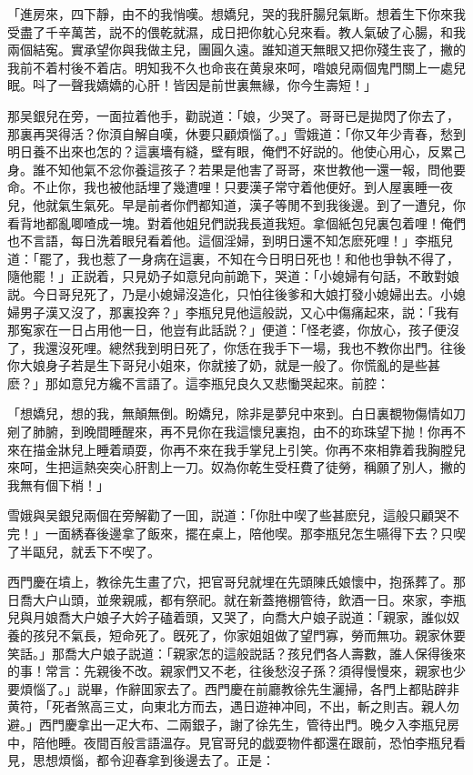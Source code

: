 「進房來，四下靜，由不的我悄嘆。想嬌兒，哭的我肝腸兒氣断。想着生下你來我受盡了千辛萬苦，説不的偎乾就濕，成日把你躭心兒來看。教人氣破了心腸，和我兩個結寃。實承望你與我做主兒，團圓久遠。誰知道天無眼又把你殘生丧了，撇的我前不着村後不着店。明知我不久也命丧在黄泉來呵，喒娘兒兩個鬼門關上一處兒眠。呌了一聲我嬌嬌的心肝！皆因是前世裏無緣，你今生壽短！」

那吴銀兒在旁，一面拉着他手，勸説道：「娘，少哭了。哥哥已是拋閃了你去了，那裏再哭得活？你湏自解自嘆，休要只顧煩惱了。」雪娥道：「你又年少青春，愁到明日養不出來也怎的？這裏墻有縫，壁有眼，俺們不好説的。他使心用心，反累己身。誰不知他氣不忿你養這孩子？若果是他害了哥哥，來世教他一還一報，問他要命。不止你，我也被他話埋了幾遭哩！只要漢子常守着他便好。到人屋裏睡一夜兒，他就氣生氣死。早是前者你們都知道，漢子等閒不到我後邊。到了一遭兒，你看背地都亂唧喳成一塊。對着他姐兒們説我長道我短。拿個紙包兒裏包着哩！俺們也不言語，每日洗着眼兒看着他。這個淫婦，到明日還不知怎麽死哩！」李瓶兒道：「罷了，我也惹了一身病在這裏，不知在今日明日死也！和他也爭執不得了，隨他罷！」正説着，只見奶子如意兒向前跪下，哭道：「小媳婦有句話，不敢對娘説。今日哥兒死了，乃是小媳婦沒造化，只怕往後爹和大娘打發小媳婦出去。小媳婦男子漢又沒了，那裏投奔？」李瓶兒見他這般説，又心中傷痛起來，説：「我有那寃家在一日占用他一日，他豈有此話説？」便道：「怪老婆，你放心，孩子便沒了，我還沒死哩。總然我到明日死了，你恁在我手下一場，我也不教你出門。往後你大娘身子若是生下哥兒小姐來，你就接了奶，就是一般了。你慌亂的是些甚麽？」那如意兒方纔不言語了。這李瓶兒良久又悲慟哭起來。前腔：

「想嬌兒，想的我，無顛無倒。盼嬌兒，除非是夢兒中來到。白日裏覩物傷情如刀剜了肺腑，到晚間睡醒來，再不見你在我這懷兒裏抱，由不的珎珠望下抛！你再不來在描金牀兒上睡着頑耍，你再不來在我手掌兒上引笑。你再不來相靠着我胸膛兒來呵，生把這熱突突心肝割上一刀。奴為你乾生受枉費了徒勞，稱願了別人，撇的我無有個下梢！」

雪娥與吴銀兒兩個在旁解勸了一囬，説道：「你肚中喫了些甚麽兒，這般只顧哭不完！」一面綉春後邊拿了飯來，擺在桌上，陪他喫。那李瓶兒怎生嚥得下去？只喫了半甌兒，就丢下不喫了。

西門慶在墳上，教徐先生畫了穴，把官哥兒就埋在先頭陳氏娘懷中，抱孫葬了。那日喬大户山頭，並衆親戚，都有祭祀。就在新蓋捲棚管待，飲酒一日。來家，李瓶兒與月娘喬大户娘子大妗子磕着頭，又哭了，向喬大户娘子説道：「親家，誰似奴養的孩兒不氣長，短命死了。旣死了，你家姐姐做了望門寡，勞而無功。親家休要笑話。」那喬大户娘子説道：「親家怎的這般説話？孩兒們各人壽數，誰人保得後來的事！常言：先親後不改。親家們又不老，往後愁沒子孫？須得慢慢來，親家也少要煩惱了。」説畢，作辭囬家去了。西門慶在前廳教徐先生灑掃，各門上都貼辟非黄符，「死者煞高三丈，向東北方而去，遇日遊神冲囘，不出，斬之則吉。親人勿避。」西門慶拿出一疋大布、二兩銀子，謝了徐先生，管待出門。晚夕入李瓶兒房中，陪他睡。夜間百般言語溫存。見官哥兒的戯耍物件都還在跟前，恐怕李瓶兒看見，思想煩惱，都令迎春拿到後邊去了。正是：

